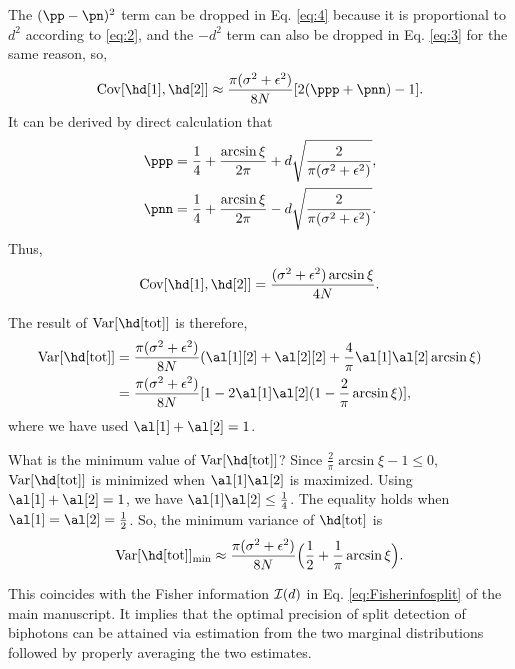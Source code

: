 The $(\pp-\pn)^{2}$ term can be dropped in Eq. \eqref{eq:4} because
it is proportional to $d^{2}$ according to \eqref{eq:2}, and the
$-d^{2}$ term can also be dropped in Eq. \eqref{eq:3} for the
same reason, so,
\begin{equation}
\cov{\hd[1],\hd[2]}\approx\frac{\pi(\sigma^{2}+\epsilon^{2})}{8N}[2(\ppp+\pnn)-1].
\end{equation}
It can be derived by direct calculation that
\begin{equation}
\begin{aligned}\ppp & =\frac{1}{4}+\frac{\arcsin\xi}{2\pi}+d\sqrt{\frac{2}{\pi(\sigma^{2}+\epsilon^{2})}},\\
\pnn & =\frac{1}{4}+\frac{\arcsin\xi}{2\pi}-d\sqrt{\frac{2}{\pi(\sigma^{2}+\epsilon^{2})}}.
\end{aligned}
\end{equation}
Thus,
\begin{equation}
\cov{\hd[1],\hd[2]}=\frac{(\sigma^{2}+\epsilon^{2})\arcsin\xi}{4N}.
\end{equation}


The result of $\var{\hd[\t]}$ is therefore,
\begin{equation}
\begin{aligned}\var{\hd[\t]} & =\frac{\pi(\sigma^{2}+\epsilon^{2})}{8N}(\al[1][2]+\al[2][2]+\frac{4}{\pi}\al[1]\al[2]\arcsin\xi)\\
 & =\frac{\pi(\sigma^{2}+\epsilon^{2})}{8N}[1-2\al[1]\al[2](1-\frac{2}{\pi}\arcsin\xi)],
\end{aligned}
\end{equation}
where we have used $\al[1]+\al[2]=1$.

What is the minimum value of $\var{\hd[\t]}$? Since $\frac{2}{\pi}\arcsin\xi-1\leq0$,
$\var{\hd[\t]}$ is minimized when $\al[1]\al[2]$ is maximized. Using
$\al[1]+\al[2]=1$, we have $\al[1]\al[2]\leq\frac{1}{4}$. The equality
holds when $\al[1]=\al[2]=\frac{1}{2}$. So, the minimum variance
of $\hd[\t]$ is
\begin{equation}
\var{\hd[\t]}_{\min}\approx\frac{\pi(\sigma^{2}+\epsilon^{2})}{8N}\Big(\frac{1}{2}+\frac{1}{\pi}\arcsin\xi\Big).
\end{equation}


This coincides with the Fisher information $\mathcal{I}(d)$ in Eq. \eqref{eq:Fisherinfosplit} of
the main manuscript. It implies that the optimal precision of split
detection of biphotons can be attained via estimation from the two
marginal distributions followed by properly averaging the two estimates.

